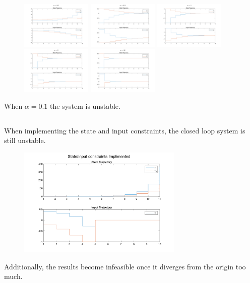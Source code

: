 \documentclass[]{article}
\begin{document}
\begin{figure}[h]
    \centering
    \includegraphics[width=0.3\textwidth]{figs/pblm2a_alpha=1e-01.png}
    \includegraphics[width=0.3\textwidth]{figs/pblm2a_alpha=5e-01.png}
    \includegraphics[width=0.3\textwidth]{figs/pblm2a_alpha=1e+00.png}
    \includegraphics[width=0.3\textwidth]{figs/pblm2a_alpha=2e+00.png}
    \includegraphics[width=0.3\textwidth]{figs/pblm2a_alpha=1e+01.png}
\end{figure}
When $\alpha = 0.1$ the system is unstable.

\newpage
\subsection{}
When implementing the state and input constraints, the closed loop system is still unstable.
\begin{figure}[h]
    \centering
    \includegraphics[width=0.7\textwidth]{figs/pblm2b}
\end{figure}
Additionally, the results become infeasible once it diverges from the origin too much.
\end{document}
